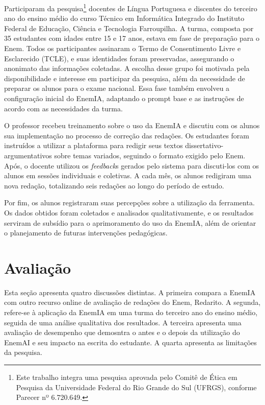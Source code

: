 \documentclass[portuguese]{textolivre}
\begin{document}
Participaram da pesquisa\footnote{Este trabalho integra uma pesquisa aprovada pelo Comitê de Ética em Pesquisa da Universidade Federal do Rio Grande do Sul (UFRGS), conforme Parecer nº 6.720.649.} docentes de Língua Portuguesa e discentes do terceiro ano do ensino médio do curso Técnico em Informática Integrado do Instituto Federal de Educação, Ciência e Tecnologia Farroupilha. A turma, composta por 35 estudantes com idades entre 15 e 17 anos, estava em fase de preparação para o Enem. Todos os participantes assinaram o Termo de Consentimento Livre e Esclarecido (TCLE), e suas identidades foram preservadas, assegurando o anonimato das informações coletadas. A escolha desse grupo foi motivada pela disponibilidade e interesse em participar da pesquisa, além da necessidade de preparar os alunos para o exame nacional. Essa fase também envolveu a configuração inicial do EnemIA, adaptando o prompt base e as instruções de acordo com as necessidades da turma. 

O professor recebeu treinamento sobre o uso da EnemIA e discutiu com os alunos sua implementação no processo de correção das redações. Os estudantes foram instruídos a utilizar a plataforma para redigir seus textos dissertativo-argumentativos sobre temas variados, seguindo o formato exigido pelo Enem. Após, o docente utilizou os \textit{feedback}s gerados pelo sistema para discuti-los com os alunos em sessões individuais e coletivas. A cada mês, os alunos redigiram uma nova redação, totalizando seis redações ao longo do período de estudo. 

Por fim, os alunos registraram suas percepções sobre a utilização da ferramenta. Os dados obtidos foram coletados e analisados qualitativamente, e os resultados serviram de subsídio para o aprimoramento do uso da EnemIA, além de orientar o planejamento de futuras intervenções pedagógicas.

\section{Avaliação}\label{avaliacao}

Esta seção apresenta quatro discussões distintas. A primeira compara a EnemIA com outro recurso online de avaliação de redações do Enem, Redarito. A segunda, refere-se à aplicação da EnemIA em uma turma do terceiro ano do ensino médio, seguida de uma análise qualitativa dos resultados. A terceira apresenta uma avaliação de desempenho que demosntra o antes e o depois da utilização do EnemAI e seu impacto na escrita do estudante. A quarta apresenta as limitações da pesquisa.
\end{document}
